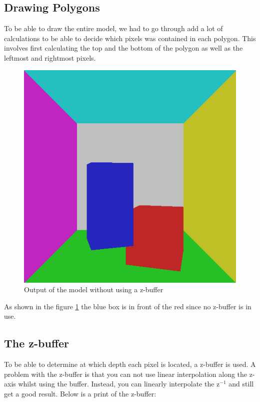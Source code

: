 \documentclass[a4paper,11pt]{article}
\begin{document}
\subsection{Drawing Polygons}
To be able to draw the entire model, we had to go through add a lot of calculations to be able to decide which pixels was contained in each polygon. This involves first calculating the top and the bottom of the polygon as well as the leftmost and rightmost pixels.   

\begin{figure}[h!]
	\centering	
	\includegraphics[width=0.45\linewidth]{screenshot15.png}
	\caption{Output of the model without using a z-buffer}
	\label{fig15}
\end{figure}

As shown in the figure \ref{fig15} the blue box is in front of the red since no z-buffer is in use.

\subsection{The z-buffer}
To be able to determine at which depth each pixel is located, a z-buffer is used. A problem with the z-buffer is that you can not use linear interpolation along the z-axis whilst using the buffer. Instead, you can linearly interpolate the z$^{-1}$ and still get a good result. Below is a print of the z-buffer:
\end{document}

